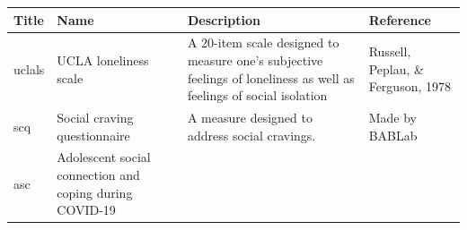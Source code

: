 \documentclass[]{book}
\begin{document}
\begin{longtable}[]{@{}llll@{}}
\toprule
\begin{minipage}[b]{0.22\columnwidth}\raggedright
Title\strut
\end{minipage} & \begin{minipage}[b]{0.27\columnwidth}\raggedright
Name\strut
\end{minipage} & \begin{minipage}[b]{0.22\columnwidth}\raggedright
Description\strut
\end{minipage} & \begin{minipage}[b]{0.18\columnwidth}\raggedright
Reference\strut
\end{minipage}\tabularnewline
\midrule
\endhead
\begin{minipage}[t]{0.22\columnwidth}\raggedright
uclals\strut
\end{minipage} & \begin{minipage}[t]{0.27\columnwidth}\raggedright
UCLA loneliness scale\strut
\end{minipage} & \begin{minipage}[t]{0.22\columnwidth}\raggedright
A 20-item scale designed to measure one's subjective feelings of loneliness as well as feelings of social isolation\strut
\end{minipage} & \begin{minipage}[t]{0.18\columnwidth}\raggedright
Russell, Peplau, \& Ferguson, 1978\strut
\end{minipage}\tabularnewline
\begin{minipage}[t]{0.22\columnwidth}\raggedright
scq\strut
\end{minipage} & \begin{minipage}[t]{0.27\columnwidth}\raggedright
Social craving questionnaire\strut
\end{minipage} & \begin{minipage}[t]{0.22\columnwidth}\raggedright
A measure designed to address social cravings.\strut
\end{minipage} & \begin{minipage}[t]{0.18\columnwidth}\raggedright
Made by BABLab\strut
\end{minipage}\tabularnewline
\begin{minipage}[t]{0.22\columnwidth}\raggedright
asc\strut
\end{minipage} & \begin{minipage}[t]{0.27\columnwidth}\raggedright
Adolescent social connection and coping during COVID-19\strut
\end{minipage} & \begin{minipage}[t]{0.22\columnwidth}\raggedright

\end{minipage}
\end{longtable}
\end{document}
